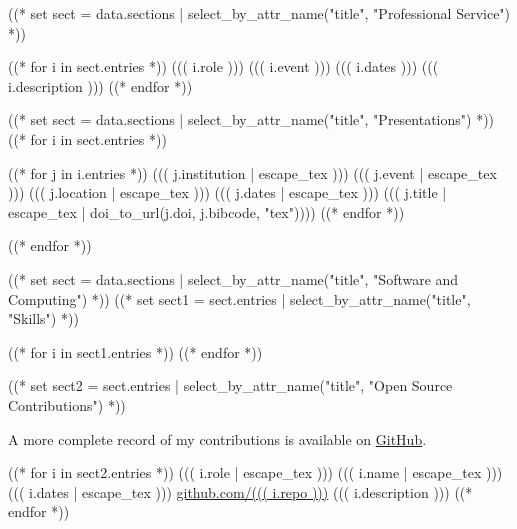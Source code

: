 \documentclass[10pt, letterpaper]{awesome-cv}
\begin{document}
((* set sect = data.sections | select_by_attr_name("title", "Professional Service") *))
\begin{cventries}
((* for i in sect.entries *))
\cventry
  {((( i.role )))}
  {((( i.event )))}
  {}
  {((( i.dates )))}
  {((( i.description )))}
((* endfor *))
\end{cventries}

((* set sect = data.sections | select_by_attr_name("title", "Presentations") *))
((* for i in sect.entries *))
\begin{cventries}
((* for j in i.entries *))
\cventry
  {((( j.institution | escape_tex )))}
  {((( j.event | escape_tex )))}
  {((( j.location | escape_tex )))}
  {((( j.dates | escape_tex )))}
  {((( j.title | escape_tex | doi_to_url(j.doi, j.bibcode, "tex"))))}
((* endfor *))
\end{cventries}
((* endfor *))

((* set sect = data.sections | select_by_attr_name("title", "Software and Computing") *))
((* set sect1 = sect.entries | select_by_attr_name("title", "Skills") *))
\begin{cvskills}
((* for i in sect1.entries *))
((* endfor *))
\end{cvskills}
((* set sect2 = sect.entries | select_by_attr_name("title", "Open Source Contributions") *))

A more complete record of my contributions is available on 
\href{https://github.com/((( data.preamble.contact.github )))}
     {GitHub}.
\begin{cventries}
((* for i in sect2.entries *))
\cventry
  {((( i.role | escape_tex )))}
  {((( i.name | escape_tex )))}
  {((( i.dates | escape_tex )))}
  {\href{https://github.com/((( i.repo )))}{github.com/((( i.repo )))}}
  {((( i.description )))}
((* endfor *))
\end{cventries}
\end{document}
